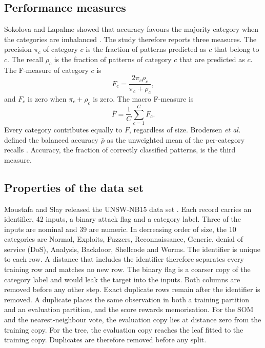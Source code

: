\documentclass[conference,10pt]{IEEEtran}
\begin{document}
\subsection{Performance measures}
Sokolova and Lapalme showed that accuracy favours the majority category when the categories are imbalanced \cite{sokolova2009}.
The study therefore reports three measures.
The precision $\pi_c$ of category $c$ is the fraction of patterns predicted as $c$ that belong to $c$.
The recall $\rho_c$ is the fraction of patterns of category $c$ that are predicted as $c$.
The F-measure of category $c$ is
\begin{equation}
F_c=\frac{2\pi_c\rho_c}{\pi_c+\rho_c},
\label{eq:f}
\end{equation}
and $F_c$ is zero when $\pi_c+\rho_c$ is zero.
The macro F-measure is
\begin{equation}
\bar{F}=\frac{1}{C}\sum_{c=1}^{C}F_c.
\label{eq:macro}
\end{equation}
Every category contributes equally to $\bar{F}$, regardless of size.
Brodersen \emph{et al.} defined the balanced accuracy $\bar{\rho}$ as the unweighted mean of the per-category recalls \cite{brodersen2010}.
Accuracy, the fraction of correctly classified patterns, is the third measure.

\subsection{Properties of the data set}
Moustafa and Slay released the UNSW-NB15 data set \cite{moustafa2015,moustafa2016}.
Each record carries an identifier, 42 inputs, a binary attack flag and a category label.
Three of the inputs are nominal and 39 are numeric.
In decreasing order of size, the 10 categories are Normal, Exploits, Fuzzers, Reconnaissance, Generic, denial of service (DoS), Analysis, Backdoor, Shellcode and Worms.
The identifier is unique to each row.
A distance that includes the identifier therefore separates every training row and matches no new row.
The binary flag is a coarser copy of the category label and would leak the target into the inputs.
Both columns are removed before any other step.
Exact duplicate rows remain after the identifier is removed.
A duplicate places the same observation in both a training partition and an evaluation partition, and the score rewards memorisation.
For the SOM and the nearest-neighbour vote, the evaluation copy lies at distance zero from the training copy.
For the tree, the evaluation copy reaches the leaf fitted to the training copy.
Duplicates are therefore removed before any split.
\end{document}
